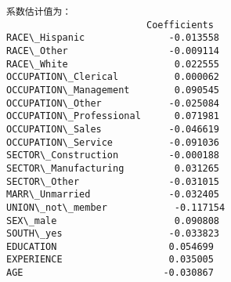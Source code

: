 \begin{Verbatim}[commandchars=\\\{\}]
系数估计值为：
                         Coefficients
RACE\_Hispanic               -0.013558
RACE\_Other                  -0.009114
RACE\_White                   0.022555
OCCUPATION\_Clerical          0.000062
OCCUPATION\_Management        0.090545
OCCUPATION\_Other            -0.025084
OCCUPATION\_Professional      0.071981
OCCUPATION\_Sales            -0.046619
OCCUPATION\_Service          -0.091036
SECTOR\_Construction         -0.000188
SECTOR\_Manufacturing         0.031265
SECTOR\_Other                -0.031015
MARR\_Unmarried              -0.032405
UNION\_not\_member            -0.117154
SEX\_male                     0.090808
SOUTH\_yes                   -0.033823
EDUCATION                    0.054699
EXPERIENCE                   0.035005
AGE                         -0.030867
\end{Verbatim}

